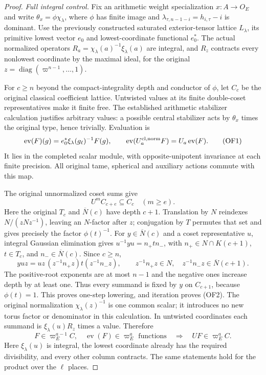 \begin{proof}
\emph{Full integral control.}
Fix an arithmetic weight specialization $x:A\to O_E$ and write
$\theta_x=\phi\chi_\lambda$, where $\phi$ has finite image and
$\lambda_{\tau,n-1-i}=h_{i,\tau}-i$ is dominant.  Use the previously
constructed saturated exterior-tensor lattice $L_\lambda$, its
primitive lowest vector $e_0$ and lowest-coordinate functional $e_0^*$.
The actual normalized operators
$R_a=\chi_\lambda(a)^{-1}\xi_\lambda(a)$ are integral, and $R_z$
contracts every nonlowest coordinate by the maximal ideal, for the
original $z=\operatorname{diag}(\varpi^{n-1},\ldots,1)$.

For $c\ge n$ beyond the compact-integrality depth and conductor of $\phi$,
let $C_c$ be the original classical coefficient lattice.  Untwisted
values at its finite double-coset representatives make it finite free.
The established arithmetic stabilizer calculation justifies arbitrary
values: a possible central stabilizer acts by $\theta_x$ times the
original type, hence trivially.  Evaluation is
\[
 \operatorname{ev}(F)(g)
   =e_0^*\xi_\lambda(g_\ell)^{-1}F(g),\qquad
 \operatorname{ev}(U_a^{\rm cl,norm}F)=U_a\operatorname{ev}(F).
                                                               \tag{OF1}
\]
It lies in the completed scalar module, with opposite-unipotent
invariance at each finite precision.  All original tame, spherical
and auxiliary actions commute with this map.

The original unnormalized coset sums give
\[
 U^mC_{c+e}\subseteq C_c\quad(m\ge e).                  \tag{OF2}
\]
Here the original $T_c$ and $\overline N(c)$ have depth $c+1$.
Translation by $N$ reindexes $N/(zNz^{-1})$, leaving an $N$-factor
after $z$; conjugation by $T$ permutes that set and gives precisely
the factor $\phi(t)^{-1}$.  For $y\in\overline N(c)$ and a coset
representative $u$, integral Gaussian elimination gives
$u^{-1}yu=n_+tn_-$, with $n_+\in N\cap K(c+1)$,
$t\in T_c$, and $n_-\in\overline N(c)$.
Since $c\ge n$,
\[
 y u z=u z\,(z^{-1}n_+z)t(z^{-1}n_-z),\qquad
 z^{-1}n_+z\in N,\quad z^{-1}n_-z\in\overline N(c+1).
\]
The positive-root exponents are at most $n-1$ and the negative ones
increase depth by at least one.  Thus every summand is fixed by $y$
on $C_{c+1}$, because $\phi(t)=1$.  This proves one-step lowering,
and iteration proves (OF2).  The original normalization
$\chi_\lambda(z)^{-1}$ is one common scalar; it introduces no new
torus factor or denominator in this calculation.
In untwisted coordinates
each summand is $\xi_\lambda(u)R_z$ times a value.  Therefore
\[
 F\in\varpi_E^{a-1}C,\quad
 \operatorname{ev}(F)\in\varpi_E^a\text{ functions}
 \quad\Longrightarrow\quad UF\in\varpi_E^aC.           \tag{OF3}
\]
Here $\xi_\lambda(u)$ is integral, the lowest coordinate already
has the required divisibility, and every other column contracts.
The same statements hold for the product over the $\ell$ places.


\end{proof}
